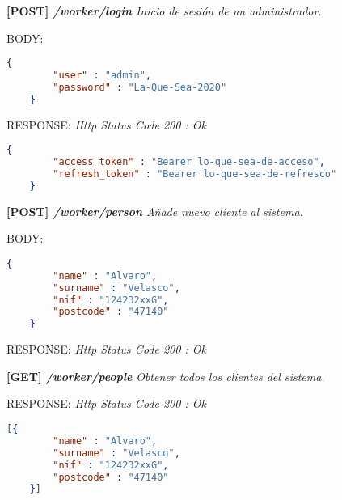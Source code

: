 \newpage %
    \textbf{[POST] \textit{/worker/login }}
\textit{Inicio de sesión de un administrador.}
    
    BODY:
   \begin{lstlisting}[language=json,firstnumber=1]
    {   
        "user" : "admin",
        "password" : "La-Que-Sea-2020"
    }
    \end{lstlisting} 
    
    RESPONSE: \newline
    \textit{Http Status Code 200 : Ok}
    \begin{lstlisting}[language=json,firstnumber=1]
    {
        "access_token" : "Bearer lo-que-sea-de-acceso",
        "refresh_token" : "Bearer lo-que-sea-de-refresco"
    }
    \end{lstlisting}
\hline \newline


    \textbf{[POST] \textit{/worker/person }}
\textit{Añade nuevo cliente al sistema.}
    
    BODY:
   \begin{lstlisting}[language=json,firstnumber=1]
    {   
        "name" : "Alvaro",
        "surname" : "Velasco",
        "nif" : "124232xxG",
        "postcode" : "47140"
    }
    \end{lstlisting} 
    
    RESPONSE: \newline
    \textit{Http Status Code 200 : Ok}
    
    \newline
    
\hline \newline

    \textbf{[GET] \textit{/worker/people }}
\textit{Obtener todos los clientes del sistema.}

    RESPONSE: \newline
    \textit{Http Status Code 200 : Ok}
    \begin{lstlisting}[language=json,firstnumber=1]
    [{   
        "name" : "Alvaro",
        "surname" : "Velasco",
        "nif" : "124232xxG",
        "postcode" : "47140"
    }]
    \end{lstlisting} 